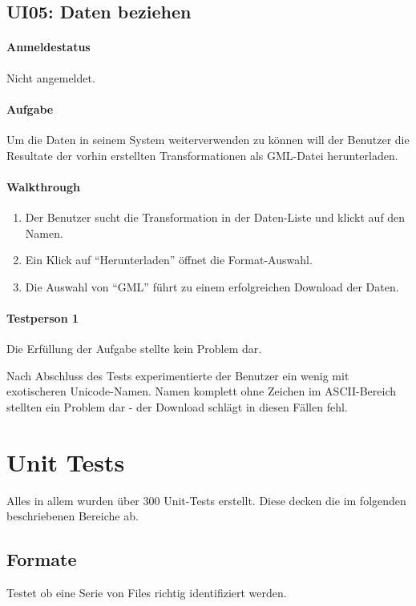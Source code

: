 \subsection{UI05: Daten beziehen}
\paragraph{Anmeldestatus} Nicht angemeldet.
\paragraph{Aufgabe} Um die Daten in seinem System weiterverwenden zu können will der Benutzer die Resultate der vorhin erstellten Transformationen als GML-Datei herunterladen.

\paragraph{Walkthrough}
\begin{enumerate}
\item Der Benutzer sucht die Transformation in der Daten-Liste und klickt auf den Namen.
\item Ein Klick auf ``Herunterladen'' öffnet die Format-Auswahl.
\item Die Auswahl von ``GML'' führt zu einem erfolgreichen Download der Daten.
\end{enumerate}

\paragraph{Testperson 1}
Die Erfüllung der Aufgabe stellte kein Problem dar.

Nach Abschluss des Tests experimentierte der Benutzer ein wenig mit exotischeren Unicode-Namen. Namen komplett ohne Zeichen im ASCII-Bereich stellten ein Problem dar - der Download schlägt in diesen Fällen fehl. 

\section{Unit Tests}
Alles in allem wurden über 300 Unit-Tests erstellt. Diese decken die im folgenden beschriebenen Bereiche ab.

\subsection{Formate}
Testet ob eine Serie von Files richtig identifiziert werden.

